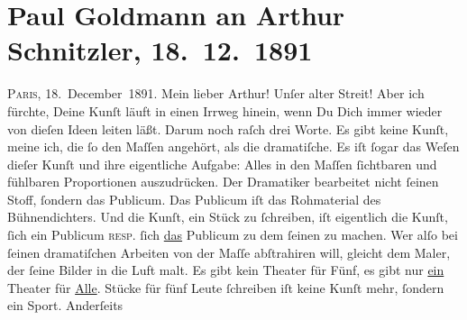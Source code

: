 

         
         \newcommand{\erwaehntePersonen}{Personen: Hermann Bahr, Richard Beer-Hofmann, Hugo von Hofmannsthal, Hilda von Mitis,  Porges}
         \newcommand{\erwaehnteInstitutionen}{}
         \newcommand{\erwaehnteOrte}{Orte: Brüssel, Paris, Wien}
         \newcommand{\erwaehnteWerke}{Werke: Das Märchen. Schauspiel in drei Aufzügen, Die Hochzeit von Valeni, Tagebuch}
               \section[Paul Goldmann an Arthur Schnitzler, 18. 12. 1891]{ Paul Goldmann an Arthur Schnitzler, 18. 12. 1891}\nopagebreak{}\rehead{ }\begin{ledgroupsized}[t]{13cm}\normalsize\beginnumbering \toendnotes[C]{\smallbreak\pagebreak[2]} 
\toendnotes[C]{\smallbreak}\pstart
           \raggedleft{}{\pb}\textsc{Paris}, 18. December 1891.\pend
           \pstart\center{}Mein lieber Arthur!\pend\pstart
           Unſer alter Streit! Aber ich fürchte, Deine Kunſt läuft in einen Irrweg hinein, wenn
               Du Dich immer wieder von dieſen Ideen leiten läßt. Darum noch raſch drei Worte. Es
               gibt keine Kunſt, meine ich, die ſo  den Maſſen angehört, als die dramatiſche. Es iſt ſogar das Weſen dieſer Kunſt
               und ihre eigentliche Aufgabe: Alles in den Maſſen ſichtbaren und fühlbaren
               Proportionen auszudrücken. Der Dramatiker bearbeitet nicht ſeinen Stoff, ſondern das
               Publicum. Das Publicum iſt das Rohmaterial des Bühnendichters. Und die Kunſt, ein
               Stück zu ſchreiben, iſt eigentlich die Kunſt, ſich ein Publicum \textsc{resp.} ſich \uline{das} Publicum {\pb}zu dem ſeinen zu machen. Wer alſo bei ſeinen
               dramatiſchen Arbeiten von der Maſſe abſtrahiren will, gleicht dem Maler, der ſeine
               Bilder in die Luft malt. Es gibt kein Theater für Fünf, es gibt nur \uline{ein} Theater für \uline{Alle}.
               Stücke für fünf Leute ſchreiben iſt keine Kunſt mehr, ſondern ein Sport. Anderſeits

\end{ledgroupsized}
